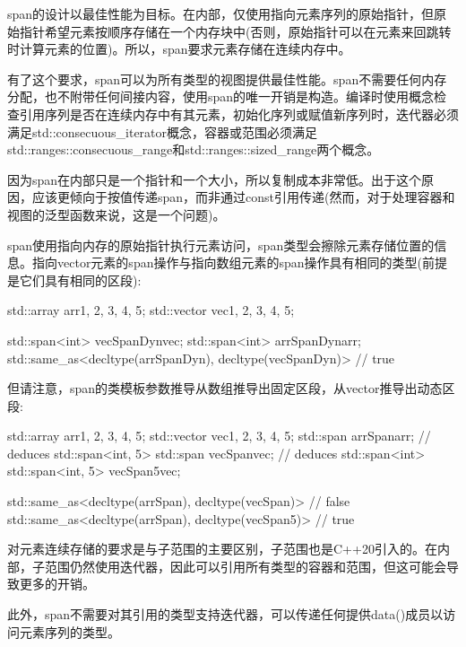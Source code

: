 
span的设计以最佳性能为目标。在内部，仅使用指向元素序列的原始指针，但原始指针希望元素按顺序存储在一个内存块中(否则，原始指针可以在元素来回跳转时计算元素的位置)。所以，span要求元素存储在连续内存中。

有了这个要求，span可以为所有类型的视图提供最佳性能。span不需要任何内存分配，也不附带任何间接内容，使用span的唯一开销是构造。编译时使用概念检查引用序列是否在连续内存中有其元素，初始化序列或赋值新序列时，迭代器必须满足std::consecuous\_iterator概念，容器或范围必须满足std::ranges::consecuous\_range和std::ranges::sized\_range两个概念。

因为span在内部只是一个指针和一个大小，所以复制成本非常低。出于这个原因，应该更倾向于按值传递span，而非通过const引用传递(然而，对于处理容器和视图的泛型函数来说，这是一个问题)。


span使用指向内存的原始指针执行元素访问，span类型会擦除元素存储位置的信息。指向vector元素的span操作与指向数组元素的span操作具有相同的类型(前提是它们具有相同的区段):

\begin{cpp}
std::array arr{1, 2, 3, 4, 5};
std::vector vec{1, 2, 3, 4, 5};

std::span<int> vecSpanDyn{vec};
std::span<int> arrSpanDyn{arr};
std::same_as<decltype(arrSpanDyn), decltype(vecSpanDyn)> // true
\end{cpp}

但请注意，span的类模板参数推导从数组推导出固定区段，从vector推导出动态区段:

\begin{cpp}
std::array arr{1, 2, 3, 4, 5};
std::vector vec{1, 2, 3, 4, 5};
std::span arrSpan{arr}; // deduces std::span<int, 5>
std::span vecSpan{vec}; // deduces std::span<int>
std::span<int, 5> vecSpan5{vec};

std::same_as<decltype(arrSpan), decltype(vecSpan)> // false
std::same_as<decltype(arrSpan), decltype(vecSpan5)> // true
\end{cpp}


对元素连续存储的要求是与子范围的主要区别，子范围也是C++20引入的。在内部，子范围仍然使用迭代器，因此可以引用所有类型的容器和范围，但这可能会导致更多的开销。

此外，span不需要对其引用的类型支持迭代器，可以传递任何提供data()成员以访问元素序列的类型。


